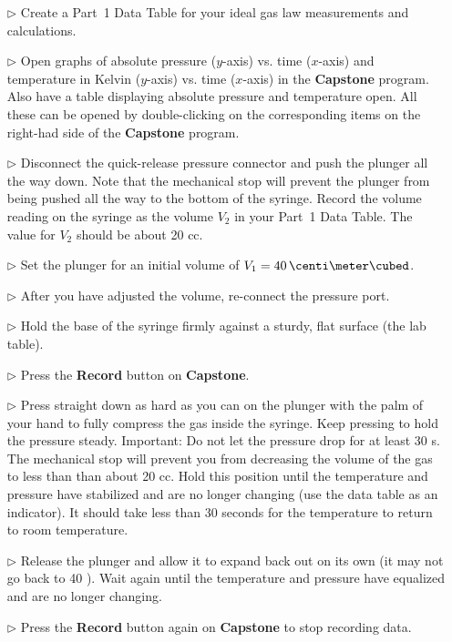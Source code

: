 \begin{itemize}
\item[$\triangleright$] Create a Part~1 Data Table for your ideal gas law measurements and calculations. 
\item[$\triangleright$] Open graphs of absolute pressure ($y$-axis) vs. time ($x$-axis) and temperature in Kelvin ($y$-axis) vs. time ($x$-axis) in the \textbf{Capstone} program. Also have a table displaying absolute pressure and temperature open. All these can be opened by double-clicking on the corresponding items on the right-had side of the \textbf{Capstone} program.
\item[$\triangleright$] Disconnect the quick-release pressure connector and push the plunger all the way down. Note that the mechanical stop will prevent the plunger from being pushed all the way to the bottom of the syringe. Record the volume reading on the syringe as the volume $V_{2}$ in your Part~1 Data Table. The value for $V_{2}$ should be about 20 cc.
\item[$\triangleright$] Set the plunger for an initial volume of $V_{1} = 40\,\centi\meter\cubed$.
\item[$\triangleright$] After you have adjusted the volume, re-connect the pressure port.
\item[$\triangleright$] Hold the base of the syringe firmly against a sturdy, flat surface (the lab table).
\item[$\triangleright$] Press the \textbf{Record} button on \textbf{Capstone}.
\item[$\triangleright$] Press straight down as hard as you can on the plunger with the palm of your hand to fully compress the gas inside the syringe. Keep pressing to hold the pressure steady. Important: Do not let the pressure drop for at least 30 s. The mechanical stop will prevent you from decreasing the volume of the gas to less than than about 20 cc. Hold this position until the temperature and pressure have stabilized and are no longer changing (use the data table as an indicator). It should take less than 30 seconds for the temperature to return to room temperature.
\item[$\triangleright$] Release the plunger and allow it to expand back out on its own (it may not go back to 40 \centi\meter\cubed). Wait again until the temperature and pressure have equalized and are no longer changing.
\item[$\triangleright$] Press the \textbf{Record} button again on \textbf{Capstone} to stop recording data.
\end{itemize}


